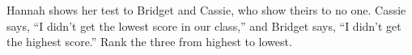 Hannah shows her test to Bridget and Cassie, who show theirs to no one. Cassie says, ``I didn't get the lowest score in our class,'' and Bridget says, ``I didn't get the highest score.'' Rank the three from highest to lowest.
